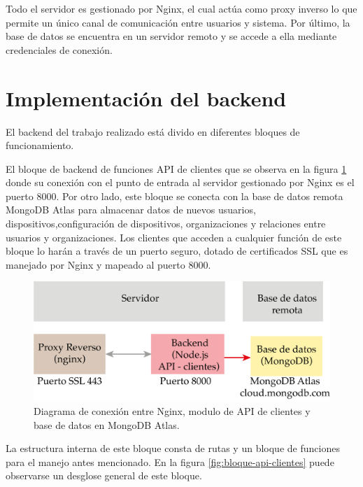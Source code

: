 Todo el servidor es gestionado por Nginx, el cual actúa como proxy inverso lo que permite un único canal de comunicación entre usuarios y sistema.  Por último, la base de datos se encuentra en un servidor remoto y se accede a ella mediante credenciales de conexión. 
 
 
\section{Implementación del backend}
\label{backend-sec}
El backend del trabajo realizado está divido en diferentes bloques de funcionamiento. 

El bloque de backend de funciones API de clientes que se observa en la figura \ref{fig:backend-clientes} donde su conexión con el punto de entrada al servidor gestionado por Nginx es el puerto 8000.  Por otro lado, este bloque se conecta con la base de datos remota MongoDB Atlas \citep{WEBSITE:35} para almacenar datos de nuevos usuarios, dispositivos,configuración de dispositivos, organizaciones y relaciones entre usuarios y organizaciones.  Los clientes que acceden a cualquier función de este bloque lo harán a través de un puerto seguro, dotado de certificados SSL que es manejado por Nginx y mapeado al puerto 8000.

\begin{figure}[htpb]
	\centering
	\includegraphics[scale=.75]{./Figures/backend-clientes.png}
	\caption[Conexión entre Nginx - API clientes y base de datos]{Diagrama de conexión entre Nginx, modulo de API de clientes y base de datos en MongoDB Atlas.}
	\label{fig:backend-clientes}
\end{figure}

La estructura interna de este bloque consta de rutas y un bloque de funciones para el manejo antes mencionado. En la figura \ref{fig:bloque-api-clientes} puede observarse un desglose general de este bloque. 

